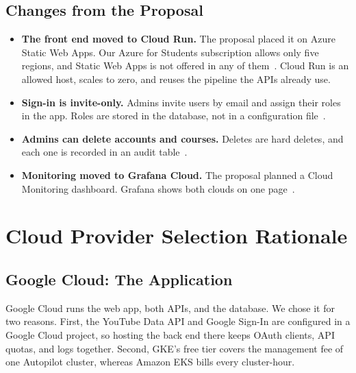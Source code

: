 \documentclass[conference]{IEEEtran}
\begin{document}
\subsection{Changes from the Proposal}
\begin{itemize}
\item \textbf{The front end moved to Cloud Run.} The proposal placed it on
Azure Static Web Apps. Our Azure for Students subscription allows only five
regions, and Static Web Apps is not offered in any of them~\cite{adr1}.
Cloud Run is an allowed host, scales to zero, and reuses the pipeline the
APIs already use.
\item \textbf{Sign-in is invite-only.} Admins invite users by email and
assign their roles in the app. Roles are stored in the database, not in a
configuration file~\cite{adr2,adr3}.
\item \textbf{Admins can delete accounts and courses.} Deletes are hard
deletes, and each one is recorded in an audit table~\cite{adr6}.
\item \textbf{Monitoring moved to Grafana Cloud.} The proposal planned a
Cloud Monitoring dashboard. Grafana shows both clouds on one
page~\cite{adr5}.
\end{itemize}

\section{Cloud Provider Selection Rationale}
\label{sec:providers}

\subsection{Google Cloud: The Application}
Google Cloud runs the web app, both APIs, and the database. We chose it for
two reasons. First, the YouTube Data API and Google Sign-In are configured
in a Google Cloud project, so hosting the back end there keeps OAuth
clients, API quotas, and logs together. Second, GKE's free tier covers the
management fee of one Autopilot cluster, whereas Amazon EKS bills every
cluster-hour.
\end{document}
